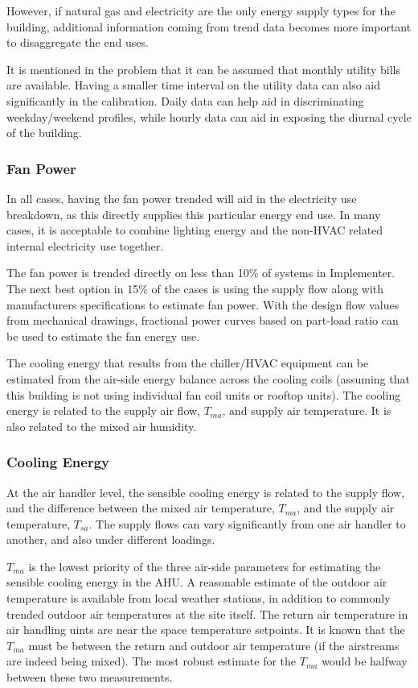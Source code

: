 However, if natural gas and electricity are the only energy supply types
for the building, additional information coming from trend data becomes
more important to disaggregate the end uses. 

It is mentioned in the problem that it can be assumed that monthly
utility bills are available. Having a smaller time interval on the
utility data can also aid significantly in the calibration. Daily data
can help aid in discriminating weekday/weekend profiles, while hourly
data can aid in exposing the diurnal cycle of the building. 


\subsubsection{Fan Power}

In all cases, having the fan power trended will aid in the electricity
use breakdown, as this directly supplies this particular energy end use.
In many cases, it is acceptable to combine lighting energy and the
non-HVAC related internal electricity use together. 

The fan power is trended directly on less than 10\% of systems in
Implementer. The next best option in 15\% of the cases is using the
supply flow along with manufacturers specifications to estimate
fan power. With the design flow values from mechanical drawings,
fractional power curves based on part-load ratio can be used to estimate
the fan energy use. 

The cooling energy that results from the chiller/HVAC equipment can be
estimated from the air-side energy balance across the cooling coils
(assuming that this building is not using individual fan coil units or
rooftop units). The cooling energy is related to the supply air flow,
\(T_{ma}\), and supply air temperature. It is also related to the mixed
air humidity. 


\subsubsection{Cooling Energy}
At the air handler level, the sensible cooling energy is related to the
supply flow, and the difference between the mixed air temperature, \(T_{ma}\),
and the supply air temperature, \(T_{sa}\). The supply flows can vary
significantly from one air handler to another, and also under different
loadings. 

\(T_{ma}\) is the lowest priority of the three air-side parameters for
estimating the sensible cooling energy in the AHU. A reasonable estimate
of the outdoor air temperature is available from local weather stations,
in addition to commonly trended outdoor air temperatures at the site
itself. The return air temperature in air handling uints are near the space
temperature setpoints. It is known that the \(T_{ma}\) must be between
the return and outdoor air temperature (if the airstreams are indeed
being mixed). The most robust estimate for the \(T_{ma}\) would be
halfway between these two measurements. 

